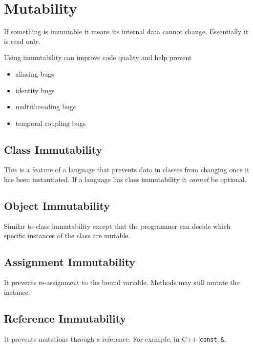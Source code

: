 \section{Mutability}
If something is immutable it means its internal data cannot change.
Essentially it is read only.

Using immutability can improve code quality and help prevent
\begin{itemize}
  \item aliasing bugs
  \item identity bugs
  \item multithreading bugs
  \item temporal coupling bugs
\end{itemize}

\subsection*{Class Immutability}
This is a feature of a language that prevents data in classes from
changing once it has been instantiated. If a language has class
immutability it \textit{cannot} be optional.

\subsection*{Object Immutability}
Similar to class immutability except that the programmer can decide
which specific instances of the class are mutable.

\subsection*{Assignment Immutability}
It prevents re-assignment to the bound variable. Methods may still
mutate the instance.

\subsection*{Reference Immutability}
It prevents mutations through a reference. For example, in C++
\lstinline|const &|.
